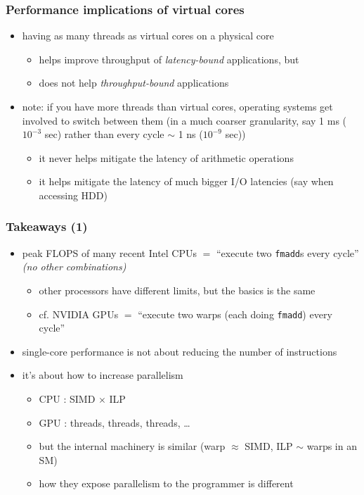 \documentclass[12pt,dvipdfmx]{beamer}
\newcommand{\ao}[1]{{\color{blue}#1}}
\newcommand{\aka}[1]{{\color{red}#1}}
\begin{document}
\begin{frame}
\frametitle{Performance implications of virtual cores}
\begin{itemize}
\item having as many threads as virtual cores on a physical core
  \begin{itemize}
  \item helps improve throughput of \ao{\it latency-bound} applications, but 
  \item does not help \ao{\it throughput-bound} applications
  \end{itemize}

\item note: if you have more threads than virtual cores, operating systems get involved
  to switch between them (in a much coarser granularity, say 1 ms ($10^{-3}$ sec)
  rather than every cycle $\sim$ 1 ns ($10^{-9}$ sec))
  \begin{itemize}
  \item it never helps mitigate the latency of arithmetic operations
  \item it helps mitigate the latency of much bigger I/O latencies
    (say when accessing HDD)
  \end{itemize}
\end{itemize}
\end{frame}
\fi

\begin{frame}
\frametitle{Takeaways (1)}
\begin{itemize}
\item peak FLOPS of many recent Intel CPUs
  $=$ ``execute two \texttt{fmadd}s every cycle'' \aka{\it (no other combinations)}
  \begin{itemize}
  \item other processors have different limits, but the basics is the same
  \item cf. NVIDIA GPUs $=$ ``execute two warps (each doing \texttt{fmadd}) every cycle''
  \end{itemize}
\item single-core performance is not about reducing the number of instructions
\item it's about how to increase parallelism
  \begin{itemize}
  \item CPU : SIMD $\times$ ILP
  \item GPU : threads, threads, threads, \ldots 
  \item but the internal machinery is similar (warp $\approx$ SIMD, ILP $\sim$ warps in an SM)
  \item how they expose parallelism to the programmer is different
  \end{itemize}
\end{itemize}
\end{frame}
\end{document}
